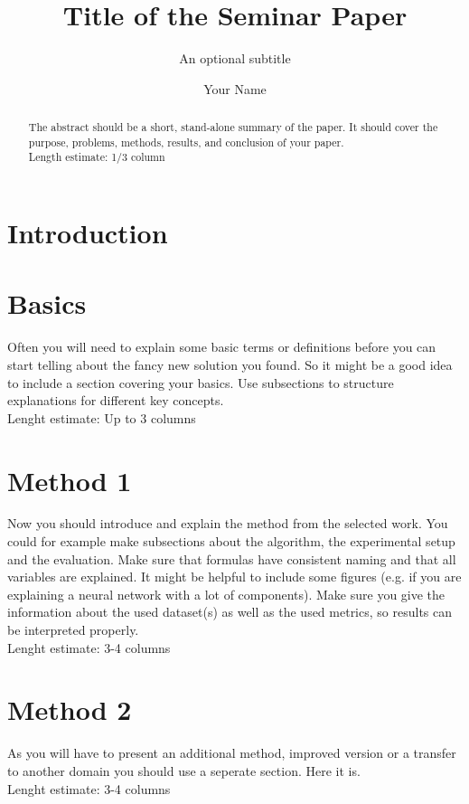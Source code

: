 \documentclass[sigconf,natbib=false]{acmart}
\begin{document}

\title{Title of the Seminar Paper}
\subtitle{An optional subtitle}

\author{Your Name}


\begin{abstract}
The abstract should be a short, stand-alone summary of the paper.
It should cover the purpose, problems, methods, results, and conclusion
of your paper.\\
Length estimate:  1/3  column
\end{abstract}



\maketitle

\section{Introduction}




\section{Basics}
Often you will need to explain some basic terms or definitions
before you can start telling about the fancy new solution you found.
So it might be a good idea to include a section covering your basics.
Use subsections to structure explanations for different key concepts.\\
Lenght estimate: Up to 3 columns
\section{Method 1}
Now you should introduce and explain the method from the selected work. You could for example make subsections about the algorithm, the experimental setup and the evaluation. 
Make sure that formulas have consistent naming and that all variables
are explained. It might be helpful to include some figures (e.g.
if you are explaining a neural network with a lot of components).
Make sure you give the information about the used dataset(s) as well as the used metrics, so results can be interpreted properly.\\
Lenght estimate: 3-4 columns

\section{Method 2}
As you will have to present an additional method, improved version or a transfer to another domain you should use a seperate section. Here it is. \\
Lenght estimate: 3-4 columns
\end{document}
